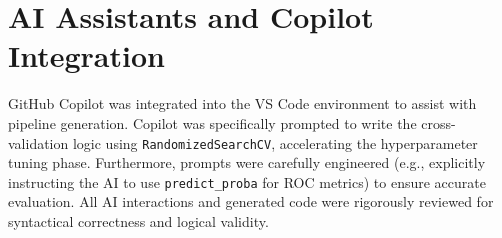 \documentclass[12pt,a4paper]{article}
\begin{document}

\section{AI Assistants and Copilot Integration}
GitHub Copilot was integrated into the VS Code environment to assist with pipeline generation. Copilot was specifically prompted to write the cross-validation logic using \texttt{RandomizedSearchCV}, accelerating the hyperparameter tuning phase. Furthermore, prompts were carefully engineered (e.g., explicitly instructing the AI to use \texttt{predict\_proba} for ROC metrics) to ensure accurate evaluation. All AI interactions and generated code were rigorously reviewed for syntactical correctness and logical validity.
\end{document}
